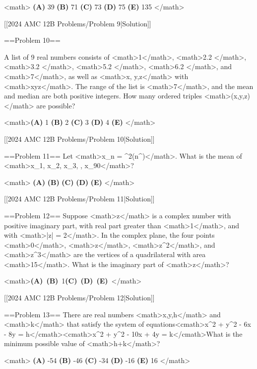 <math>
\textbf{(A) }39 \qquad
\textbf{(B) }71 \qquad
\textbf{(C) }73 \qquad
\textbf{(D) }75 \qquad
\textbf{(E) }135 \qquad
</math>

[[2024 AMC 12B Problems/Problem 9|Solution]]

==Problem 10==

A list of 9 real numbers consists of <math>1</math>, <math>2.2 </math>, <math>3.2 </math>, <math>5.2 </math>, <math>6.2 </math>, and <math>7</math>, as well as <math>x, y,z</math> with <math>x\leq y\leq z</math>. The range of the list is <math>7</math>, and the mean and median are both positive integers. How many ordered triples <math>(x,y,z)</math> are possible?

<math>\textbf{(A) }1 \qquad\textbf{(B) }2 \qquad\textbf{(C) }3 \qquad\textbf{(D) }4 \qquad\textbf{(E) }\qquad</math>

[[2024 AMC 12B Problems/Problem 10|Solution]]

==Problem 11==
Let <math>x_{n} = \sin^2(n^\circ)</math>. What is the mean of <math>x_{1}, x_{2}, x_{3}, \cdots, x_{90}</math>?

<math>
\textbf{(A) } \qquad
\textbf{(B) } \qquad
\textbf{(C) } \qquad
\textbf{(D) } \qquad
\textbf{(E) } \qquad
</math>

[[2024 AMC 12B Problems/Problem 11|Solution]]

==Problem 12==
Suppose <math>z</math> is a complex number with positive imaginary part, with real part greater than <math>1</math>, and with <math>|z| = 2</math>. In the complex plane, the four points <math>0</math>, <math>z</math>, <math>z^{2}</math>, and <math>z^{3}</math> are the vertices of a quadrilateral with area <math>15</math>. What is the imaginary part of <math>z</math>?

<math>\textbf{(A)}~\qquad\textbf{(B)}~1\qquad\textbf{(C)}~\qquad\textbf{(D)}~\qquad\textbf{(E)}~</math>

[[2024 AMC 12B Problems/Problem 12|Solution]]

==Problem 13==
There are real numbers <math>x,y,h</math> and <math>k</math> that satisfy the system of equations<cmath>x^2 + y^2 - 6x - 8y = h</cmath><cmath>x^2 + y^2 - 10x + 4y = k</cmath>What is the minimum possible value of <math>h+k</math>?

<math>
\textbf{(A) }-54 \qquad
\textbf{(B) }-46 \qquad
\textbf{(C) }-34 \qquad
\textbf{(D) }-16 \qquad
\textbf{(E) }16 \qquad
</math>

